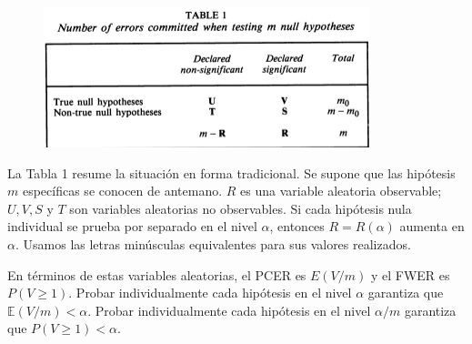\documentclass[11pt,letterpaper]{article}
\newcommand{\mE}{\mathbb{E}}
\begin{document}
\begin{figure}[H]
\centering
\includegraphics[scale=.8]{tabla_1.png}
\end{figure}

La Tabla 1 resume la situación en forma tradicional. Se supone que las hipótesis $m$ específicas se conocen de antemano. $R$ es una variable aleatoria observable; $U, V, S $ y $T$ son variables aleatorias no observables. Si cada hipótesis nula individual se prueba por separado en el nivel $\alpha$, entonces $R=R (\alpha)$ aumenta en $\alpha$. Usamos las letras minúsculas equivalentes para sus valores realizados.

En términos de estas variables aleatorias, el PCER es $E(V/m)$ y el FWER es $P(V\geq 1)$. Probar individualmente cada hipótesis en el nivel $\alpha$ garantiza que $\mE(V / m) <\alpha$. Probar individualmente cada hipótesis en el nivel $\alpha/m$ garantiza que $P (V\geq 1) <\alpha$.
\end{document}
